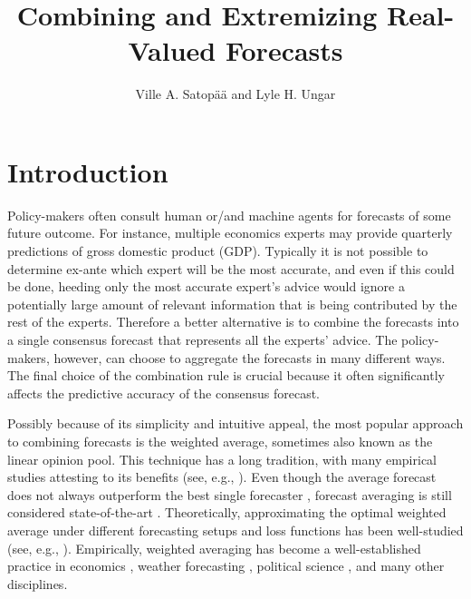 \documentclass[11pt]{article}
\title{Combining and Extremizing Real-Valued Forecasts}
\author{
Ville A. Satop\"a\"a and Lyle H. Ungar}
\date{}
\theoremstyle{definition}
\theoremstyle{definition}
\begin{document}
\maketitle

\begin{abstract}


\end{abstract}


\section{Introduction} \label{introduction}

Policy-makers often consult human or/and machine agents for forecasts
of some future outcome. For instance, multiple economics experts may
provide quarterly predictions of gross domestic product (GDP). Typically it is not possible to determine ex-ante which expert will be the most accurate, and even if this could be done, heeding only the most accurate expert's advice would ignore a potentially large amount of relevant information that is being contributed by the rest of the experts. Therefore a better alternative is to combine the
forecasts into a single consensus forecast that represents all the experts' advice. 
The policy-makers, however, can choose to aggregate the forecasts in many different ways. The final choice of the combination rule is crucial because it often
significantly affects the predictive accuracy of the consensus
forecast. 



Possibly because of its simplicity and intuitive appeal, the most
popular approach to combining forecasts is the weighted average, sometimes also known as the linear opinion pool. 
This technique has a long tradition, with many empirical studies attesting to its benefits (see, e.g., \citealt{bates1969combination, clemen1989combining, armstrong2}). 
Even though the average forecast does not always outperform the best single forecaster \citep{hibon2005combine},
forecast averaging is still considered state-of-the-art \citep{elliott2013handbook}. Theoretically,  approximating the optimal weighted average under different forecasting setups and loss functions has been well-studied (see, e.g., \citealt{juditsky2008learning, degroot1991optimal}). Empirically, weighted averaging has become a well-established practice in economics \citep{blix2001good},  weather forecasting \citep{raftery2005using}, political science \citep{graefea2014combining}, and many other disciplines.
%
\end{document}
